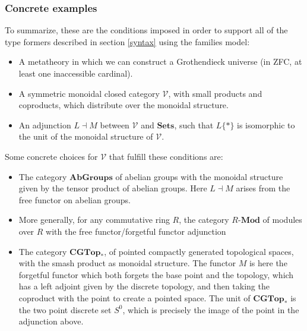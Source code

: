 \subsubsection{Concrete examples}
To summarize, these are the conditions imposed in order  to support all of the type formers described in section \ref{syntax} using the families model:
\begin{itemize}
\item A metatheory in which we can construct a Grothendieck universe (in ZFC, at least one inaccessible cardinal).
\item A symmetric monoidal closed category $\mathcal{V}$, with small products and coproducts, which distribute over the monoidal structure.
\item An adjunction $L \dashv M$ between $\mathcal{V}$ and $\mathbf{Sets}$, such that $L\{*\}$ is isomorphic to the unit of the monoidal structure of $\mathcal{V}$.
\end{itemize}
Some concrete choices for $\mathcal{V}$ that fulfill these conditions are:
\begin{itemize}
\item The category $\mathbf{AbGroups}$ of abelian groups with the monoidal structure given by the tensor product of abelian groups. Here $L \dashv M$ arises from the free functor on abelian groups.
\item More generally, for any commutative ring $R$, the category $R$-$\mathbf{Mod}$ of modules over $R$ with the free functor/forgetful functor adjunction
\item The category $\mathbf{CGTop}_*$, of pointed compactly generated topological spaces, with the smash product as monoidal structure. The functor $M$ is here the forgetful functor which both forgets the base point and the topology, which has a left adjoint given by the discrete topology, and then taking the coproduct with the point to create a pointed space. The unit of $\mathbf{CGTop}_*$ is the two point discrete set $S^0$, which is precisely the image of the point in the adjunction above.
\end{itemize}
